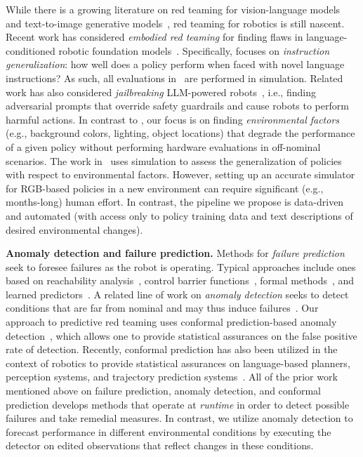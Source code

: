 While there is a growing literature on red teaming for vision-language models~\cite{li2024red, liu2024arondight} and text-to-image generative models~\cite{rando2022red, gandikota2023erasing}, red teaming for robotics is still nascent. Recent work has considered \emph{embodied red teaming} for finding flaws in language-conditioned robotic foundation models~\cite{karnik2024embodied}. Specifically, \cite{karnik2024embodied} focuses on \emph{instruction generalization}: how well does a policy perform when faced with novel language instructions? As such, all evaluations in~\cite{karnik2024embodied} are performed in simulation. Related work has also considered \emph{jailbreaking} LLM-powered robots~\cite{robey2024jailbreaking}, i.e., finding adversarial prompts that override safety guardrails and cause robots to perform harmful actions. In contrast to \cite{karnik2024embodied, robey2024jailbreaking}, our focus is on finding \emph{environmental factors} (e.g., background colors, lighting, object locations) that degrade the performance of a given policy without performing hardware evaluations in off-nominal scenarios. The work in~\cite{pumacay2024colosseum} uses simulation to assess the generalization of policies with respect to environmental factors. However, setting up an accurate simulator for RGB-based policies in a new environment can require significant (e.g., months-long) human effort. In contrast, the pipeline we propose is data-driven and automated (with access only to policy training data and text descriptions of desired environmental changes). 

{\bf Anomaly detection and failure prediction.} Methods for \emph{failure prediction} seek to foresee failures as the robot is operating. Typical approaches include ones based on reachability analysis~\cite{akametalu2014reachability, hsu2023sim, hsu2023safety}, control barrier functions~\cite{ames2016control}, formal methods~\cite{alshiekh2018safe}, and learned predictors~\cite{farid2022failure, xie2022ask, gokmen2023asking, liu2024model}. A related line of work on \emph{anomaly detection} seeks to detect conditions that are far from nominal and may thus induce failures~\cite{richter2017safe, sinha2022system, salehi2021unified, sinha2024real,sindhwani2020unsupervised}. Our approach to predictive red teaming uses conformal prediction-based anomaly detection~\cite{vovk2005algorithmic, laxhammar2013online, luo2024sample, sinha2023closing}, which allows one to provide statistical assurances on the false positive rate of detection. Recently, conformal prediction has also been utilized in the context of robotics to provide statistical assurances on language-based planners, perception systems, and trajectory prediction systems~\cite{lindemann2023safe, dixit2023adaptive, ren2023robots, dixit2024perceive, lindemann2024formal}. All of the prior work mentioned above on failure prediction, anomaly detection, and conformal prediction develops methods that operate at \emph{runtime} in order to detect possible failures and take remedial measures. In contrast, we utilize anomaly detection to forecast performance in different environmental conditions by executing the detector on edited observations that reflect changes in these conditions. 

